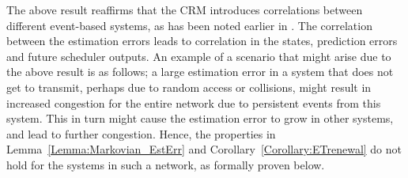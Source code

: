 \documentclass[journal]{IEEEtran}
\begin{document}
The above result reaffirms that the CRM introduces correlations between different event-based systems, as has been noted earlier in \cite{Cervin2008,Rabi2009}. The correlation between the estimation errors leads to correlation in the states, prediction errors and future scheduler outputs. An example of a scenario that might arise due to the above result is as follows; a large estimation error in a system that does not get to transmit, perhaps due to random access or collisions, might result in increased congestion for the entire network due to persistent events from this system. This in turn might cause the estimation error to grow in other systems, and lead to further congestion. Hence, the properties in Lemma~\ref{Lemma:Markovian_EstErr} and Corollary~\ref{Corollary:ETrenewal} do not hold for the systems in such a network, as formally proven below.
\end{document}
